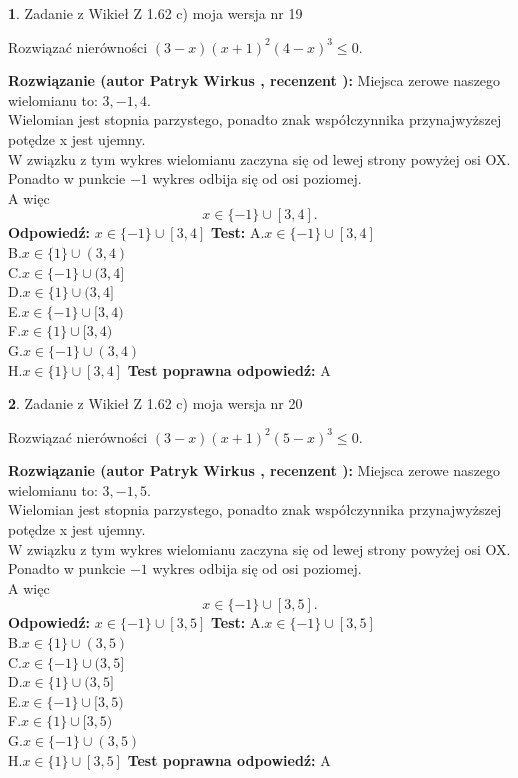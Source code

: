 \documentclass[12pt, a4paper]{article}
\theoremstyle{definition} %
\newtheorem{zad}{}
\newcommand{\zadStart}[1]{\begin{zad}#1\newline}
\newcommand{\zadStop}{\end{zad}}
\newcommand{\rozwStart}[2]{\noindent \textbf{Rozwiązanie (autor #1 , recenzent #2): }\newline}
\newcommand{\rozwStop}{\newline}
\newcommand{\odpStart}{\noindent \textbf{Odpowiedź:}\newline}
\newcommand{\odpStop}{\newline}
\newcommand{\testStart}{\noindent \textbf{Test:}\newline}
\newcommand{\testStop}{\newline}
\newcommand{\kluczStart}{\noindent \textbf{Test poprawna odpowiedź:}\newline}
\newcommand{\kluczStop}{\newline}
\begin{document}
\zadStart{Zadanie z Wikieł Z 1.62 c) moja wersja nr 19}

Rozwiązać nierówności $(3-x)(x+1)^{2}(4-x)^{3}\le0$.
\zadStop
\rozwStart{Patryk Wirkus}{}
Miejsca zerowe naszego wielomianu to: $3, -1, 4$.\\
Wielomian jest stopnia parzystego, ponadto znak współczynnika przy\linebreak najwyższej potędze x jest ujemny.\\ W związku z tym wykres wielomianu zaczyna się od lewej strony powyżej osi OX.\\
Ponadto w punkcie $-1$ wykres odbija się od osi poziomej.\\
A więc $$x \in \{-1\} \cup [3,4].$$
\rozwStop
\odpStart
$x \in \{-1\} \cup [3,4]$
\odpStop
\testStart
A.$x \in \{-1\} \cup [3,4]$\\
B.$x \in \{1\} \cup (3,4)$\\
C.$x \in \{-1\} \cup (3,4]$\\
D.$x \in \{1\} \cup (3,4]$\\
E.$x \in \{-1\} \cup [3,4)$\\
F.$x \in \{1\} \cup [3,4)$\\
G.$x \in \{-1\} \cup (3,4)$\\
H.$x \in \{1\} \cup [3,4]$
\testStop
\kluczStart
A
\kluczStop



\zadStart{Zadanie z Wikieł Z 1.62 c) moja wersja nr 20}

Rozwiązać nierówności $(3-x)(x+1)^{2}(5-x)^{3}\le0$.
\zadStop
\rozwStart{Patryk Wirkus}{}
Miejsca zerowe naszego wielomianu to: $3, -1, 5$.\\
Wielomian jest stopnia parzystego, ponadto znak współczynnika przy\linebreak najwyższej potędze x jest ujemny.\\ W związku z tym wykres wielomianu zaczyna się od lewej strony powyżej osi OX.\\
Ponadto w punkcie $-1$ wykres odbija się od osi poziomej.\\
A więc $$x \in \{-1\} \cup [3,5].$$
\rozwStop
\odpStart
$x \in \{-1\} \cup [3,5]$
\odpStop
\testStart
A.$x \in \{-1\} \cup [3,5]$\\
B.$x \in \{1\} \cup (3,5)$\\
C.$x \in \{-1\} \cup (3,5]$\\
D.$x \in \{1\} \cup (3,5]$\\
E.$x \in \{-1\} \cup [3,5)$\\
F.$x \in \{1\} \cup [3,5)$\\
G.$x \in \{-1\} \cup (3,5)$\\
H.$x \in \{1\} \cup [3,5]$
\testStop
\kluczStart
A
\kluczStop
\end{document}

